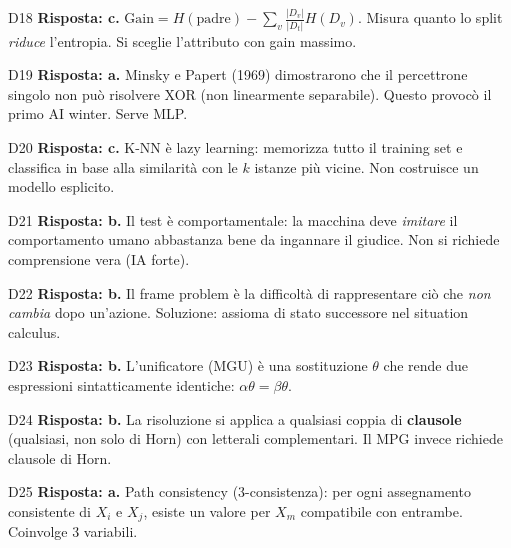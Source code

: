 \documentclass[12pt,a4paper]{article}
\begin{document}
\begin{risposta}{D18}
\textbf{Risposta: c.} $\text{Gain} = H(\text{padre}) - \sum_v \frac{|D_v|}{|D_t|} H(D_v)$. Misura quanto lo split \emph{riduce} l'entropia. Si sceglie l'attributo con gain massimo.
\end{risposta}

\begin{risposta}{D19}
\textbf{Risposta: a.} Minsky e Papert (1969) dimostrarono che il percettrone singolo non può risolvere XOR (non linearmente separabile). Questo provocò il primo AI winter. Serve MLP.
\end{risposta}

\begin{risposta}{D20}
\textbf{Risposta: c.} K-NN è lazy learning: memorizza tutto il training set e classifica in base alla similarità con le $k$ istanze più vicine. Non costruisce un modello esplicito.
\end{risposta}

\begin{risposta}{D21}
\textbf{Risposta: b.} Il test è comportamentale: la macchina deve \emph{imitare} il comportamento umano abbastanza bene da ingannare il giudice. Non si richiede comprensione vera (IA forte).
\end{risposta}

\begin{risposta}{D22}
\textbf{Risposta: b.} Il frame problem è la difficoltà di rappresentare ciò che \emph{non cambia} dopo un'azione. Soluzione: assioma di stato successore nel situation calculus.
\end{risposta}

\begin{risposta}{D23}
\textbf{Risposta: b.} L'unificatore (MGU) è una sostituzione $\theta$ che rende due espressioni sintatticamente identiche: $\alpha\theta = \beta\theta$.
\end{risposta}

\begin{risposta}{D24}
\textbf{Risposta: b.} La risoluzione si applica a qualsiasi coppia di \textbf{clausole} (qualsiasi, non solo di Horn) con letterali complementari. Il MPG invece richiede clausole di Horn.
\end{risposta}

\begin{risposta}{D25}
\textbf{Risposta: a.} Path consistency (3-consistenza): per ogni assegnamento consistente di $X_i$ e $X_j$, esiste un valore per $X_m$ compatibile con entrambe. Coinvolge 3 variabili.
\end{risposta}
\end{document}

